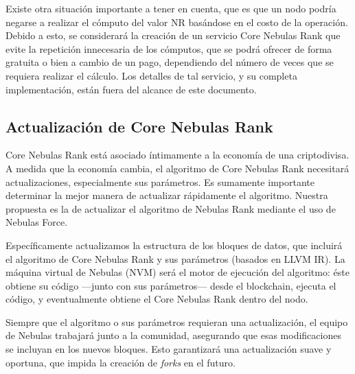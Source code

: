 Existe otra situación importante a tener en cuenta, que es que un nodo podría negarse a realizar el cómputo del valor NR basándose en el costo de la operación. Debido a esto, se considerará la creación de un servicio Core Nebulas Rank que evite la repetición innecesaria de los cómputos, que se podrá ofrecer de forma gratuita o bien a cambio de un pago, dependiendo del número de veces que se requiera realizar el cálculo. Los detalles de tal servicio, y su completa implementación, están fuera del alcance de este documento.

\subsection{Actualización de Core Nebulas Rank}
Core Nebulas Rank está asociado íntimamente a la economía de una criptodivisa. A medida que la economía cambia, el algoritmo de Core Nebulas Rank necesitará actualizaciones, especialmente sus parámetros. Es sumamente importante determinar la mejor manera de actualizar rápidamente el algoritmo. Nuestra propuesta es la de actualizar el algoritmo de Nebulas Rank mediante el uso de Nebulas Force.

Específicamente actualizamos la estructura de los bloques de datos, que incluirá el algoritmo de Core Nebulas Rank y sus parámetros (basados en LLVM IR). La máquina virtual de Nebulas (NVM) será el motor de ejecución del algoritmo: éste obtiene su código —junto con sus parámetros— desde el blockchain, ejecuta el código, y eventualmente obtiene el Core Nebulas Rank dentro del nodo.

Siempre que el algoritmo o sus parámetros requieran una actualización, el equipo de Nebulas trabajará junto a la comunidad, asegurando que esas modificaciones se incluyan en los nuevos bloques. Esto garantizará una actualización suave y oportuna, que impida la creación de \textit{forks} en el futuro.